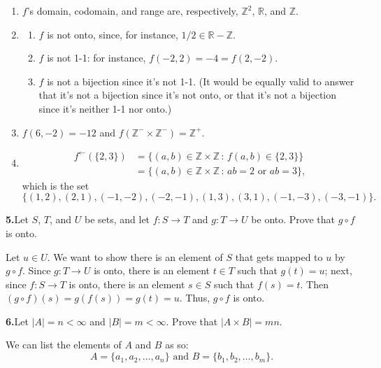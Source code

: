 \documentclass[10pt,]{book}
\theoremstyle{plain}
\theoremstyle{definition}
\theoremstyle{definition}
\theoremstyle{definition}
\theoremstyle{definition}
\numberwithin{equation}{section}
\def\Z{\mathbb{Z}}
\def\R{\mathbb{R}}
\newcommand{\lt}{<}
\newcommand{\amp}{&}
\begin{document}
\par\smallskip
\leavevmode%
\begin{enumerate}[label=(\alph*)]
\item\hypertarget{li-46}{}\(f\)'s domain, codomain, and range are, respectively, \(\Z^2\), \(\R\), and \(\Z\).%
\item\hypertarget{li-47}{}%
\begin{enumerate}[label=\roman*.]
\item\hypertarget{li-48}{}\(f\) is not onto, since, for instance, \(1/2\in \R-\Z\).%
\item\hypertarget{li-49}{}\(f\) is not 1-1: for instance, \(f(-2,2)=-4=f(2,-2)\).%
\item\hypertarget{li-50}{}\(f\) is not a bijection since it's not 1-1. (It would be equally valid to answer that it's not a bijection since it's not onto, or that it's not a bijection since it's neither 1-1 nor onto.)%
\end{enumerate}
%
\item\hypertarget{li-51}{}\(f(6,-2)=-12\) and \(f(\Z^-\times \Z^-)=\Z^+\).%
\item\hypertarget{li-52}{}%
\begin{align*}
f^{\leftarrow}(\{2,3\})\amp =\{(a,b)\in \Z\times \Z\,:\, f(a,b)\in \{2,3\}\}\\
\amp =\{(a,b)\in \Z\times \Z\,:\, ab=2 \mbox{ or }  ab=3\},
\end{align*}
which is the set%
\begin{equation*}
\{(1,2),(2,1),(-1,-2),(-2,-1),(1,3),(3,1),(-1,-3),(-3,-1)\}.
\end{equation*}
%
\end{enumerate}
\par\smallskip
\noindent\textbf{5.}\quad{}Let \(S\), \(T\), and \(U\) be sets, and let \(f: S\to T\) and \(g: T\to U\) be onto. Prove that \(g \circ f\) is onto.%
\par\smallskip
Let \(u\in U\). We want to show there is an element of \(S\) that gets mapped to \(u\) by \(g\circ f\). Since \(g:T\to U\) is onto, there is an element \(t\in T\) such that \(g(t)=u\); next, since \(f:S\to T\) is onto, there is an element \(s\in S\) such that \(f(s)=t\). Then \((g\circ f)(s)=g(f(s))=g(t)=u\). Thus, \(g\circ f\) is onto.%
\par\smallskip
\noindent\textbf{6.}\quad{}Let \(|A|=n\lt \infty\) and \(|B|=m\lt  \infty\). Prove that \(|A\times B|=mn\).%
\par\smallskip
We can list the elements of \(A\) and \(B\) as so:%
\begin{equation*}
A=\{a_1,a_2,\ldots, a_n\} \mbox{ and } B=\{b_1,b_2,\ldots, b_m\}.
\end{equation*}
\end{document}
